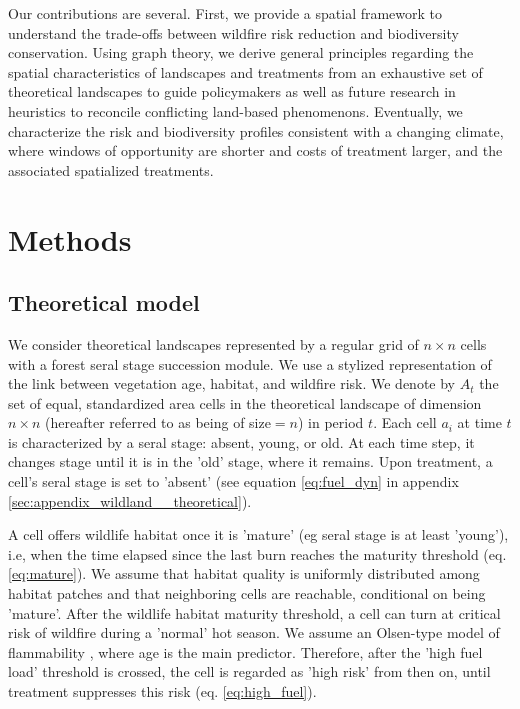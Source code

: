 Our contributions are several. First, we provide a spatial framework to understand the trade-offs between wildfire risk reduction and biodiversity conservation. Using graph theory, we derive general principles regarding the spatial characteristics of landscapes and treatments from an exhaustive set of theoretical landscapes to guide policymakers as well as future research in heuristics to reconcile conflicting land-based phenomenons. Eventually, we characterize the risk and biodiversity profiles consistent with a changing climate, where windows of opportunity are shorter and costs of treatment larger, and the associated spatialized treatments. 

\section{Methods}
\label{section:methods}
\subsection{Theoretical model}

We consider theoretical landscapes represented by a regular grid of $n\times n$ cells with a forest seral stage succession module. We use a stylized representation of the link between vegetation age, habitat, and wildfire risk. 
We denote by $A_t$ the set of equal, standardized area cells in the theoretical landscape of dimension $n\times n$ (hereafter referred to as being of size$=n$) in period $t$. Each cell $a_i$ at time $t$ is characterized by a seral stage: absent, young, or old. At each time step, it changes stage until it is in the 'old' stage, where it remains. Upon treatment, a cell's seral stage is set to 'absent' (see equation \ref{eq:fuel_dyn} in appendix \ref{sec:appendix_wildland__theoretical}). 

A cell offers wildlife habitat once it is 'mature' (eg seral stage is at least 'young'), i.e, when the time elapsed since the last burn reaches the maturity threshold (eq. \ref{eq:mature}). We assume that habitat quality is uniformly distributed among habitat patches and that neighboring cells are reachable, conditional on being 'mature'. After the wildlife habitat maturity threshold, a cell can turn at critical risk of wildfire during a 'normal' hot season. We assume an Olsen-type model of flammability \citep{Olson1963,mccarthy_theoretical_2001}, where age is the main predictor. Therefore, after the 'high fuel load' threshold is crossed, the cell is regarded as 'high risk' from then on, until treatment suppresses this risk (eq. \ref{eq:high_fuel}). 

